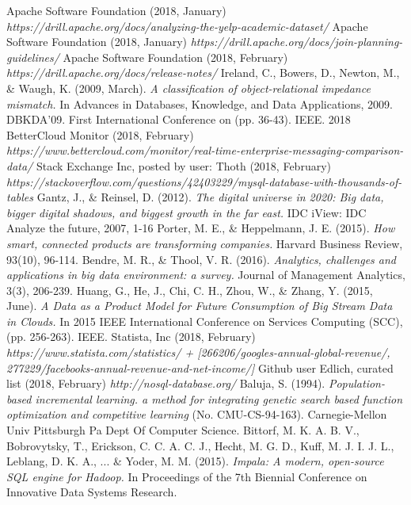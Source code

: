 \documentclass[a4paper,english]{report}
\begin{document}
\begin{thebibliography}{1}
		Apache Software Foundation (2018, January) \emph{https://drill.apache.org/docs/analyzing-the-yelp-academic-dataset/}
		Apache Software Foundation (2018, January)
		\emph{https://drill.apache.org/docs/join-planning-guidelines/}
		Apache Software Foundation (2018, February) 	\emph{https://drill.apache.org/docs/release-notes/}
		Ireland, C., Bowers, D., Newton, M., \& Waugh, K. (2009, March). \emph{A classification of object-relational impedance mismatch.} In Advances in Databases, Knowledge, and Data Applications, 2009. DBKDA'09. First International Conference on (pp. 36-43). IEEE.
		2018 BetterCloud Monitor (2018, February)
		\emph{https://www.bettercloud.com/monitor/real-time-enterprise-messaging-comparison-data/}
		Stack Exchange Inc, posted by user: Thoth (2018, February) \emph{https://stackoverflow.com/questions/42403229/mysql-database-with-thousands-of-tables}
		Gantz, J., \& Reinsel, D. (2012). \emph{The digital universe in 2020: Big data, bigger digital shadows, and biggest growth in the far east.} IDC iView: IDC Analyze the future, 2007, 1-16
		Porter, M. E., \& Heppelmann, J. E. (2015). \emph{How smart, connected products are transforming companies.} Harvard Business Review, 93(10), 96-114.
		Bendre, M. R., \& Thool, V. R. (2016). \emph{Analytics, challenges and applications in big data environment: a survey.} Journal of Management Analytics, 3(3), 206-239.
		Huang, G., He, J., Chi, C. H., Zhou, W., \& Zhang, Y. (2015, June). \emph{A Data as a Product Model for Future Consumption of Big Stream Data in	Clouds.} In 2015 IEEE International Conference on Services Computing (SCC), (pp. 256-263). IEEE.
		Statista, Inc (2018, February) \emph{https://www.statista.com/statistics/ + [266206/googles-annual-global-revenue/, 277229/facebooks-annual-revenue-and-net-income/]}
		Github user Edlich, curated list (2018, February) \emph{http://nosql-database.org/}
		Baluja, S. (1994). \emph{Population-based incremental learning. a method for integrating genetic search based function optimization and competitive learning} (No. CMU-CS-94-163). Carnegie-Mellon Univ Pittsburgh Pa Dept Of Computer Science.
		Bittorf, M. K. A. B. V., Bobrovytsky, T., Erickson, C. C. A. C. J., Hecht, M. G. D., Kuff, M. J. I. J. L., Leblang, D. K. A., ... \& Yoder, M. M. (2015). \emph{Impala: A modern, open-source SQL engine for Hadoop.} In Proceedings of the 7th Biennial Conference on Innovative Data Systems Research.

\end{thebibliography}
\end{document}
